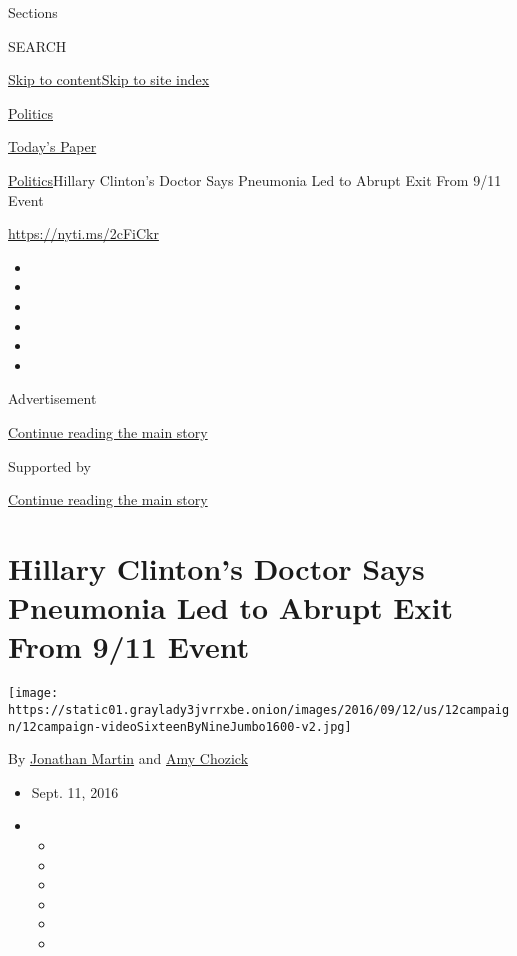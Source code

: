 Sections

SEARCH

\protect\hyperlink{site-content}{Skip to
content}\protect\hyperlink{site-index}{Skip to site index}

\href{https://www.nytimes3xbfgragh.onion/section/politics}{Politics}

\href{https://myaccount.nytimes3xbfgragh.onion/auth/login?response_type=cookie\&client_id=vi}{}

\href{https://www.nytimes3xbfgragh.onion/section/todayspaper}{Today's
Paper}

\href{/section/politics}{Politics}\textbar{}Hillary Clinton's Doctor
Says Pneumonia Led to Abrupt Exit From 9/11 Event

\url{https://nyti.ms/2cFiCkr}

\begin{itemize}
\item
\item
\item
\item
\item
\item
\end{itemize}

Advertisement

\protect\hyperlink{after-top}{Continue reading the main story}

Supported by

\protect\hyperlink{after-sponsor}{Continue reading the main story}

\hypertarget{hillary-clintons-doctor-says-pneumonia-led-to-abrupt-exit-from-911-event}{%
\section{Hillary Clinton's Doctor Says Pneumonia Led to Abrupt Exit From
9/11
Event}\label{hillary-clintons-doctor-says-pneumonia-led-to-abrupt-exit-from-911-event}}

\texttt{[image: https://static01.graylady3jvrrxbe.onion/images/2016/09/12/us/12campaign/12campaign-videoSixteenByNineJumbo1600-v2.jpg]}

By \href{http://www.nytimes3xbfgragh.onion/by/jonathan-martin}{Jonathan
Martin} and \href{http://www.nytimes3xbfgragh.onion/by/amy-chozick}{Amy
Chozick}

\begin{itemize}
\item
  Sept. 11, 2016
\item
  \begin{itemize}
  \item
  \item
  \item
  \item
  \item
  \item
  \end{itemize}
\end{itemize}

